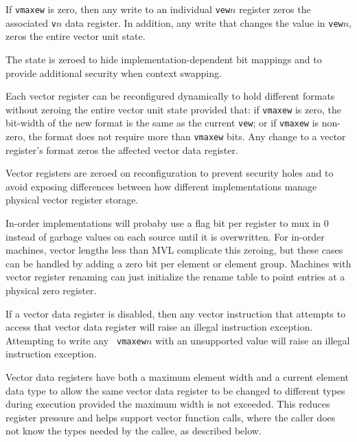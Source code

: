If {\tt vmaxew} is zero, then any write to an individual {\tt vew}$n$
register zeros the associated {\tt v}$n$ data register.  In addition,
any write that changes the value in {\tt vew}$n$, zeros the entire vector
unit state.

\begin{commentary}
  The state is zeroed to hide implementation-dependent bit mappings
  and to provide additional security when context swapping.
\end{commentary}

Each vector register can be reconfigured dynamically to hold different
formats without zeroing the entire vector unit state provided that: if
{\tt vmaxew} is zero, the bit-width of the new format is the same as
the current {\tt vew}; or if {\tt vmaxew} is non-zero, the format does
not require more than {\tt vmaxew} bits.  Any change to a vector
register's format zeros the affected vector data register.


\begin{commentary}
  Vector registers are zeroed on reconfiguration to prevent security
  holes and to avoid exposing differences between how different
  implementations manage physical vector register storage.

  In-order implementations will probaby use a flag bit per register to
  mux in 0 instead of garbage values on each source until it is
  overwritten.  For in-order machines, vector lengths less than MVL
  complicate this zeroing, but these cases can be handled by adding a
  zero bit per element or element group.  Machines with vector
  register renaming can just initialize the rename table to point
  entries at a physical zero register.
\end{commentary}

If a vector data register is disabled, then any vector instruction
that attempts to access that vector data register will raise an
illegal instruction exception.  Attempting to write any {\tt
  vmaxew}$n$ with an unsupported value will raise an illegal
instruction exception.

\begin{commentary}
  Vector data registers have both a maximum element width and a
  current element data type to allow the same vector data register to
  be changed to different types during execution provided the
  maximum width is not exceeded.  This reduces register pressure and
  helps support vector function calls, where the caller does not know
  the types needed by the callee, as described below.
\end{commentary}

